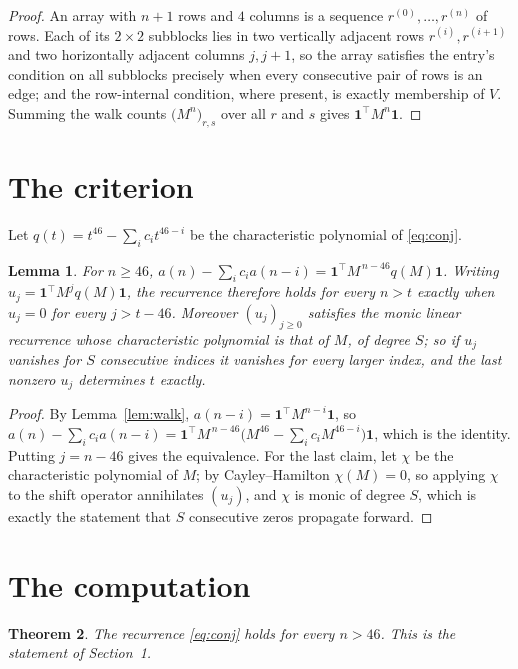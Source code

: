 \documentclass[11pt,a4paper]{article}
\theoremstyle{plain}
\newtheorem{theorem}{Theorem}
\newtheorem{lemma}[theorem]{Lemma}
\theoremstyle{definition}
\begin{document}
\begin{proof}
An array with $n+1$ rows and $4$ columns is a sequence $r^{(0)},\dots,r^{(n)}$ of
rows. Each of its $2\times2$ subblocks lies in two vertically adjacent rows
$r^{(i)},r^{(i+1)}$ and two horizontally adjacent columns $j,j+1$, so the array satisfies
the entry's condition on all subblocks precisely when every consecutive pair of rows is an
edge; and the row-internal condition, where present, is exactly membership of $V$. Summing
the walk counts $\bigl(M^{n}\bigr)_{r,s}$ over all $r$ and $s$ gives
$\mathbf{1}^{\!\top}M^{n}\mathbf{1}$.
\end{proof}

\section{The criterion}

Let $q(t)=t^{46}-\sum_i c_i t^{46-i}$ be the characteristic polynomial of
\eqref{eq:conj}.

\begin{lemma}\label{lem:crit}
For $n\ge46$,
$a(n)-\sum_i c_i a(n-i)=\mathbf{1}^{\!\top}M^{\,n-46}q(M)\mathbf{1}$. Writing
$u_j=\mathbf{1}^{\!\top}M^{j}q(M)\mathbf{1}$, the recurrence therefore holds for every
$n>t$ exactly when $u_j=0$ for every $j>t-46$. Moreover $(u_j)_{j\ge0}$ satisfies the
monic linear recurrence whose characteristic polynomial is that of $M$, of degree $S$; so
if $u_j$ vanishes for $S$ consecutive indices it vanishes for every larger index, and the
last nonzero $u_j$ determines $t$ exactly.
\end{lemma}

\begin{proof}
By Lemma~\ref{lem:walk}, $a(n-i)=\mathbf{1}^{\!\top}M^{n-i}\mathbf{1}$, so
$a(n)-\sum_i c_i a(n-i)
=\mathbf{1}^{\!\top}M^{\,n-46}\bigl(M^{46}-\sum_i c_i M^{46-i}\bigr)
\mathbf{1}$, which is the identity. Putting $j=n-46$ gives the equivalence. For the
last claim, let $\chi$ be the characteristic polynomial of $M$; by Cayley--Hamilton
$\chi(M)=0$, so applying $\chi$ to the shift operator annihilates $(u_j)$, and $\chi$ is
monic of degree $S$, which is exactly the statement that $S$ consecutive zeros propagate
forward.
\end{proof}

\section{The computation}

\begin{theorem}
The recurrence \eqref{eq:conj} holds for every $n>46$. This is the statement of
Section~1.
\end{theorem}
\end{document}
